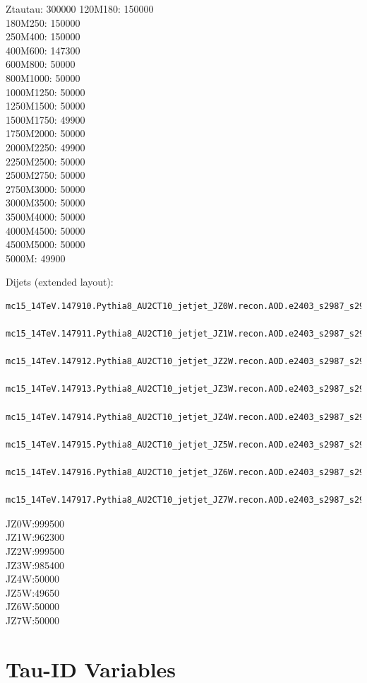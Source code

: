 Ztautau: 300000
120M180: 150000\\
180M250: 150000\\
250M400: 150000\\
400M600: 147300\\
600M800: 50000\\
800M1000: 50000\\
1000M1250: 50000\\
1250M1500: 50000\\
1500M1750: 49900\\
1750M2000: 50000\\
2000M2250: 49900\\
2250M2500: 50000\\
2500M2750: 50000\\
2750M3000: 50000\\
3000M3500: 50000\\
3500M4000: 50000\\
4000M4500: 50000\\
4500M5000: 50000\\
5000M: 49900

Dijets (extended layout):
\begin{lstlisting}[basicstyle=\small\ttfamily, breaklines=true]
  mc15_14TeV.147910.Pythia8_AU2CT10_jetjet_JZ0W.recon.AOD.e2403_s2987_s2999_r8820
  mc15_14TeV.147911.Pythia8_AU2CT10_jetjet_JZ1W.recon.AOD.e2403_s2987_s2999_r8820
  mc15_14TeV.147912.Pythia8_AU2CT10_jetjet_JZ2W.recon.AOD.e2403_s2987_s2999_r8820
  mc15_14TeV.147913.Pythia8_AU2CT10_jetjet_JZ3W.recon.AOD.e2403_s2987_s2999_r8820
  mc15_14TeV.147914.Pythia8_AU2CT10_jetjet_JZ4W.recon.AOD.e2403_s2987_s2999_r8820
  mc15_14TeV.147915.Pythia8_AU2CT10_jetjet_JZ5W.recon.AOD.e2403_s2987_s2999_r8820
  mc15_14TeV.147916.Pythia8_AU2CT10_jetjet_JZ6W.recon.AOD.e2403_s2987_s2999_r8820
  mc15_14TeV.147917.Pythia8_AU2CT10_jetjet_JZ7W.recon.AOD.e2403_s2987_s2999_r8820
\end{lstlisting}

JZ0W:999500\\
JZ1W:962300\\
JZ2W:999500\\
JZ3W:985400\\
JZ4W:50000\\
JZ5W:49650\\
JZ6W:50000\\
JZ7W:50000


\clearpage
\section{Tau-ID Variables}
\label{app:tauid_vars}

